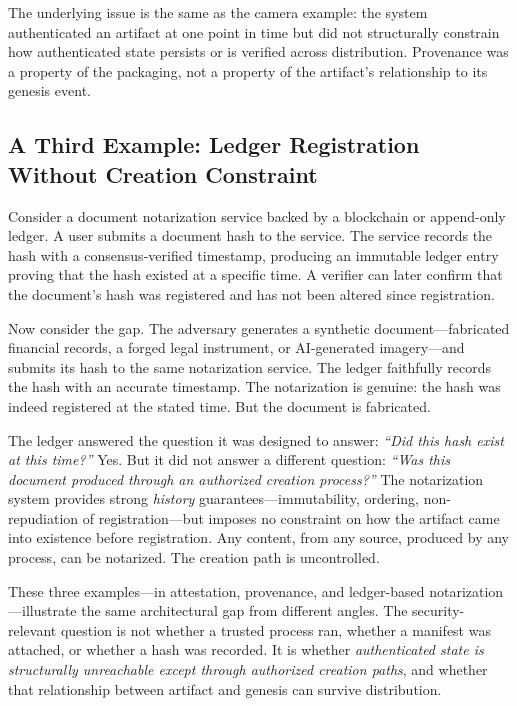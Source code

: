 \documentclass[11pt,letterpaper]{article}
\theoremstyle{occplain}
\theoremstyle{occremark}
\begin{document}
The underlying issue is the same as the camera example: the system authenticated an artifact at one point in time but did not structurally constrain how authenticated state persists or is verified across distribution. Provenance was a property of the packaging, not a property of the artifact's relationship to its genesis event.


\subsection{A Third Example: Ledger Registration Without Creation Constraint}
\label{sec:ledger-example}

Consider a document notarization service backed by a blockchain or append-only ledger. A user submits a document hash to the service. The service records the hash with a consensus-verified timestamp, producing an immutable ledger entry proving that the hash existed at a specific time. A verifier can later confirm that the document's hash was registered and has not been altered since registration.

Now consider the gap. The adversary generates a synthetic document---fabricated financial records, a forged legal instrument, or AI-generated imagery---and submits its hash to the same notarization service. The ledger faithfully records the hash with an accurate timestamp. The notarization is genuine: the hash was indeed registered at the stated time. But the document is fabricated.

The ledger answered the question it was designed to answer: \emph{``Did this hash exist at this time?''} Yes. But it did not answer a different question: \emph{``Was this document produced through an authorized creation process?''} The notarization system provides strong \emph{history} guarantees---immutability, ordering, non-repudiation of registration---but imposes no constraint on how the artifact came into existence before registration. Any content, from any source, produced by any process, can be notarized. The creation path is uncontrolled.

These three examples---in attestation, provenance, and ledger-based notarization---illustrate the same architectural gap from different angles. The security-relevant question is not whether a trusted process ran, whether a manifest was attached, or whether a hash was recorded. It is whether \emph{authenticated state is structurally unreachable except through authorized creation paths}, and whether that relationship between artifact and genesis can survive distribution.
\end{document}
